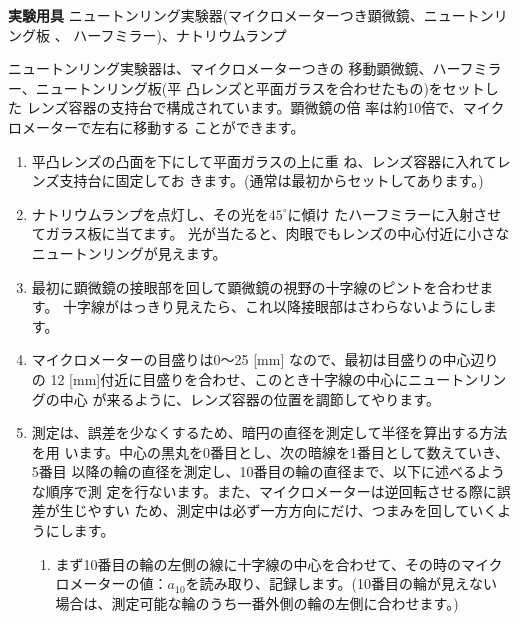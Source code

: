\newpage

\jikken

\begin{itemsquarebox}[c]{\bf 実験用具}
ニュートンリング実験器(マイクロメーターつき顕微鏡、ニュートンリング板 、
ハーフミラー)、ナトリウムランプ
\end{itemsquarebox}

\bigskip



ニュートンリング実験器は、マイクロメーターつきの
移動顕微鏡、ハーフミラー、ニュートンリング板(平
凸レンズと平面ガラスを合わせたもの)をセットした
レンズ容器の支持台で構成されています。顕微鏡の倍
率は約10倍で、マイクロメーターで左右に移動する
ことができます。

\begin{enumerate}

\item 平凸レンズの凸面を下にして平面ガラスの上に重
ね、レンズ容器に入れてレンズ支持台に固定してお
きます。(通常は最初からセットしてあります。)

\item ナトリウムランプを点灯し、その光を$45^\circ$に傾け
たハーフミラーに入射させてガラス板に当てます。
光が当たると、肉眼でもレンズの中心付近に小さな
ニュートンリングが見えます。

\item 最初に顕微鏡の接眼部を回して顕微鏡の視野の十字線のピントを合わせます。
十字線がはっきり見えたら、これ以降接眼部はさわらないようにします。

\item マイクロメーターの目盛りは0〜25 [mm] なので、最初は目盛りの中心辺りの
12 [mm]付近に目盛りを合わせ、このとき十字線の中心にニュートンリングの中心
が来るように、レンズ容器の位置を調節してやります。

\item 測定は、誤差を少なくするため、暗円の直径を測定して半径を算出する方法を用
います。中心の黒丸を0番目とし、次の暗線を1番目として数えていき、5番目
以降の輪の直径を測定し、10番目の輪の直径まで、以下に述べるような順序で測
定を行ないます。また、マイクロメーターは逆回転させる際に誤差が生じやすい
ため、測定中は必ず一方方向にだけ、つまみを回していくようにします。

\begin{enumerate}

\item まず10番目の輪の左側の線に十字線の中心を合わせて、その時のマイク 
ロメーターの値：$a_{10}$を読み取り、記録します。(10番目の輪が見えない 
場合は、測定可能な輪のうち一番外側の輪の左側に合わせます。)


\end{enumerate}
\end{enumerate}
